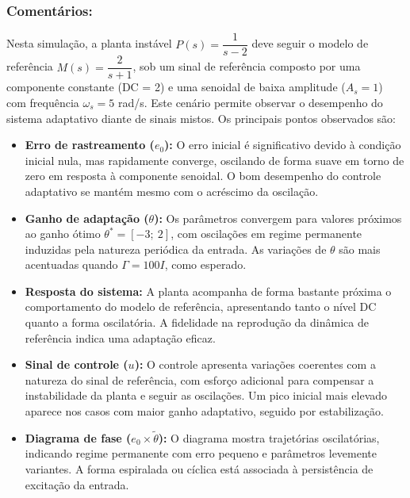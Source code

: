 \documentclass[10pt]{article}
\begin{document}
\subsubsection{Comentários:}

Nesta simulação, a planta instável $P(s) = \dfrac{1}{s - 2}$ deve seguir o modelo de referência $M(s) = \dfrac{2}{s + 1}$, sob um sinal de referência composto por uma componente constante (DC = 2) e uma senoidal de baixa amplitude ($A_s = 1$) com frequência $\omega_s = 5$ rad/s. Este cenário permite observar o desempenho do sistema adaptativo diante de sinais mistos. Os principais pontos observados são:

\begin{itemize}
    \item \textbf{Erro de rastreamento ($e_0$):} O erro inicial é significativo devido à condição inicial nula, mas rapidamente converge, oscilando de forma suave em torno de zero em resposta à componente senoidal. O bom desempenho do controle adaptativo se mantém mesmo com o acréscimo da oscilação.

    \item \textbf{Ganho de adaptação ($\theta$):} Os parâmetros convergem para valores próximos ao ganho ótimo $\theta^* = [-3;\ 2]$, com oscilações em regime permanente induzidas pela natureza periódica da entrada. As variações de $\theta$ são mais acentuadas quando $\Gamma = 100I$, como esperado.

    \item \textbf{Resposta do sistema:} A planta acompanha de forma bastante próxima o comportamento do modelo de referência, apresentando tanto o nível DC quanto a forma oscilatória. A fidelidade na reprodução da dinâmica de referência indica uma adaptação eficaz.

    \item \textbf{Sinal de controle ($u$):} O controle apresenta variações coerentes com a natureza do sinal de referência, com esforço adicional para compensar a instabilidade da planta e seguir as oscilações. Um pico inicial mais elevado aparece nos casos com maior ganho adaptativo, seguido por estabilização.

    \item \textbf{Diagrama de fase ($e_0 \times \tilde{\theta}$):} O diagrama mostra trajetórias oscilatórias, indicando regime permanente com erro pequeno e parâmetros levemente variantes. A forma espiralada ou cíclica está associada à persistência de excitação da entrada.

\end{itemize}
\end{document}
